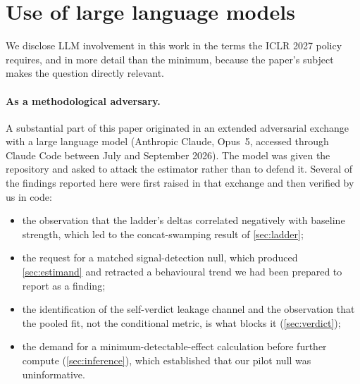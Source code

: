 %

\section*{Use of large language models}
\label{sec:aiuse}

We disclose LLM involvement in this work in the terms the ICLR 2027 policy requires, and in more
detail than the minimum, because the paper's subject makes the question directly relevant.

\paragraph{As a methodological adversary.} A substantial part of this paper originated in an
extended adversarial exchange with a large language model (Anthropic Claude, Opus~5, accessed
through Claude Code between July and September 2026). The model was given the repository and asked
to attack the estimator rather than to defend it. Several of the findings reported here were first
raised in that exchange and then verified by us in code:

\begin{itemize}[nosep,leftmargin=*]
\item the observation that the ladder's deltas correlated negatively with baseline strength, which
      led to the concat-swamping result of \cref{sec:ladder};
\item the request for a matched signal-detection null, which produced \cref{sec:estimand} and
      retracted a behavioural trend we had been prepared to report as a finding;
\item the identification of the self-verdict leakage channel and the observation that the pooled
      fit, not the conditional metric, is what blocks it (\cref{sec:verdict});
\item the demand for a minimum-detectable-effect calculation before further compute
      (\cref{sec:inference}), which established that our pilot null was uninformative.
\end{itemize}

